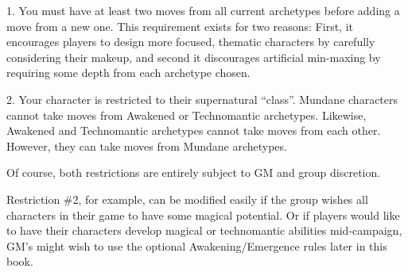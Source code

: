 \documentclass[oneside,10pt]{article}
\begin{document}
\begin{multicols}{2}
\begin{dent}
1. You must have at least two moves from all current archetypes before
adding a move from a new one. This requirement exists for two reasons:
First, it encourages players to design more focused, thematic
characters by carefully considering their makeup, and second it
discourages artificial min-maxing by requiring some depth from each
archetype chosen.

2. Your character is restricted to their supernatural
``class''. Mundane characters cannot take moves from Awakened or
Technomantic archetypes. Likewise, Awakened and Technomantic
archetypes cannot take moves from each other. However, they can take
moves from Mundane archetypes. 

\end{dent}

Of course, both restrictions are entirely subject to GM and
group discretion.

Restriction \#2, for example, can be modified easily if the group
wishes all characters in their game to have some magical potential. Or
if players would like to have their characters develop magical or
technomantic abilities mid-campaign, GM's might wish to use the
optional Awakening/Emergence rules later in this book.

\end{multicols}

\newpage
{}
\end{document}
